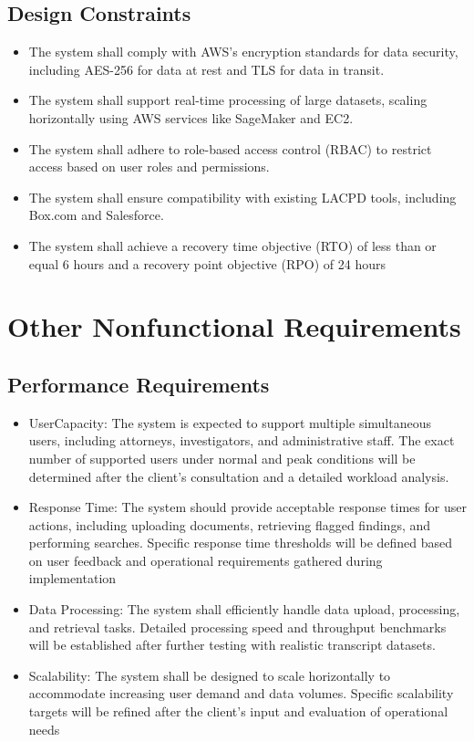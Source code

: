 \documentclass[12pt]{article}
\begin{document}
\subsection{Design Constraints}
\begin{itemize}
  \item The system shall comply with AWS’s encryption standards for data security, including AES-256 for data at rest and TLS for data in transit.
  \item The system shall support real-time processing of large datasets, scaling horizontally using AWS services like SageMaker and EC2.
\item The system shall adhere to role-based access control (RBAC) to restrict access based on user roles and permissions.
\item  The system shall ensure compatibility with existing LACPD tools, including Box.com and Salesforce.
\item The system shall achieve a recovery time objective (RTO) of less than or equal 6 hours and a recovery point objective (RPO) of 24 hours
\end{itemize}

\section{Other Nonfunctional Requirements}
\subsection{Performance Requirements}
\begin{itemize}
  \item UserCapacity: The system is expected to support multiple simultaneous users, including
 attorneys, investigators, and administrative staff. The exact number of supported users under
 normal and peak conditions will be determined after the client's consultation and a detailed
 workload analysis.
  \item Response Time: The system should provide acceptable response times for user actions,
 including uploading documents, retrieving flagged findings, and performing searches.
 Specific response time thresholds will be defined based on user feedback and operational
 requirements gathered during implementation
\item Data Processing: The system shall efficiently handle data upload, processing, and retrieval
 tasks. Detailed processing speed and throughput benchmarks will be established after further
 testing with realistic transcript datasets.
\item Scalability: The system shall be designed to scale horizontally to accommodate increasing
 user demand and data volumes. Specific scalability targets will be refined after the client's
 input and evaluation of operational needs
\end{itemize}
\end{document}
